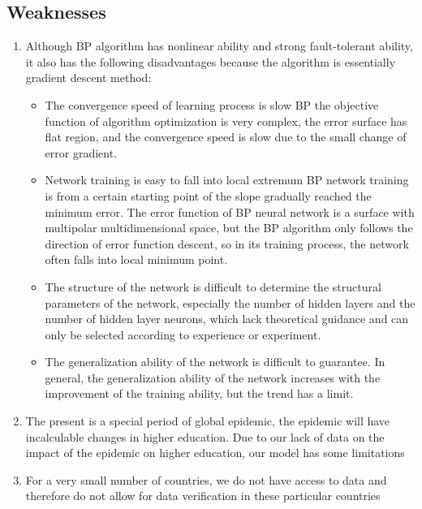 \documentclass[12pt]{article}  %
\begin{document}
\subsection{Weaknesses}

\begin{enumerate}[\bfseries 1.]

\item Although BP algorithm has nonlinear ability and strong fault-tolerant ability, it also has the following disadvantages because the algorithm is essentially gradient descent method:


\begin{itemize}
    \item The convergence speed of learning process is slow BP the objective function of algorithm optimization is very complex, the error surface has flat region, and the convergence speed is slow due to the small change of error gradient.
    \item Network training is easy to fall into local extremum BP network training is from a certain starting point of the slope gradually reached the minimum error. The error function of BP neural network is a surface with multipolar multidimensional space, but the BP algorithm only follows the direction of error function descent, so in its training process, the network often falls into local minimum point.
    \item The structure of the network is difficult to determine the structural parameters of the network, especially the number of hidden layers and the number of hidden layer neurons, which lack theoretical guidance and can only be selected according to experience or experiment.
    \item The generalization ability of the network is difficult to guarantee. In general, the generalization ability of the network increases with the improvement of the training ability, but the trend has a limit.
 \end{itemize}

\item The present is a special period of global epidemic, the epidemic will have incalculable changes in higher education. Due to our lack of data on the impact of the epidemic on higher education, our model has some limitations

\item For a very small number of countries, we do not have access to data and therefore do not allow for data verification in these particular countries

\end{enumerate}
\end{document}
